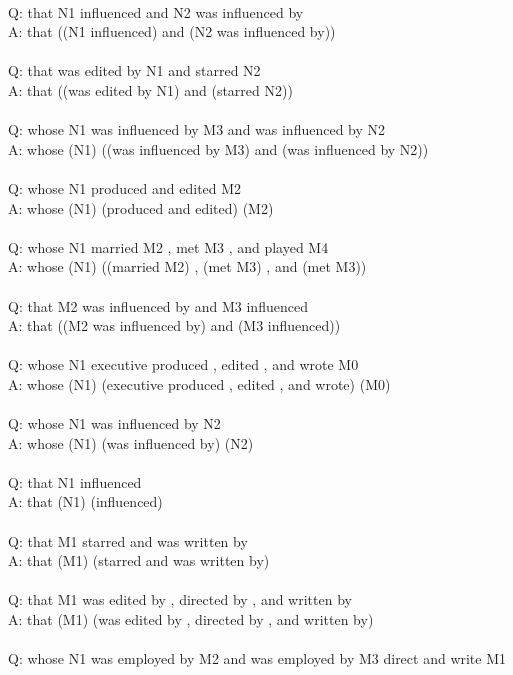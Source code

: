 \documentclass{article} \usepackage{iclr2022_conference,times}
\newcommand{\prompt}[1]{{\footnotesize \textsf{#1}}}
\begin{document}
\prompt{\\
Q: that N1 influenced and N2 was influenced by \\
A: that ((N1 influenced) and (N2 was influenced by)) \\
 \\
Q: that was edited by N1 and starred N2 \\
A: that ((was edited by N1) and (starred N2)) \\
 \\
Q: whose N1 was influenced by M3 and was influenced by N2 \\
A: whose (N1) ((was influenced by M3) and (was influenced by N2)) \\
 \\
Q: whose N1 produced and edited M2 \\
A: whose (N1) (produced and edited) (M2) \\
 \\
Q: whose N1 married M2 , met M3 , and played M4 \\
A: whose (N1) ((married M2) , (met M3) , and (met M3)) \\
 \\
Q: that M2 was influenced by and M3 influenced \\
A: that ((M2 was influenced by) and (M3 influenced)) \\
 \\
Q: whose N1 executive produced , edited , and wrote M0 \\
A: whose (N1) (executive produced , edited , and wrote) (M0) \\
 \\
Q: whose N1 was influenced by N2 \\
A: whose (N1) (was influenced by) (N2) \\
 \\
Q: that N1 influenced \\
A: that (N1) (influenced) \\
 \\
Q: that M1 starred and was written by \\
A: that (M1) (starred and was written by) \\
 \\
Q: that M1 was edited by , directed by , and written by \\
A: that (M1) (was edited by , directed by , and written by) \\
 \\
Q: whose N1 was employed by M2 and was employed by M3 direct and write M1 \\
}
\end{document}
